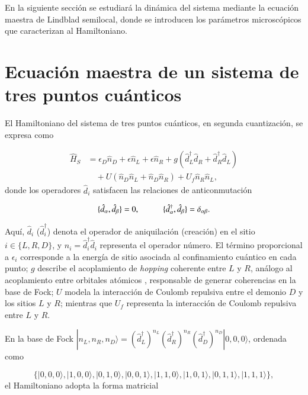 En la siguiente sección se estudiará la dinámica del sistema mediante la ecuación maestra de Lindblad semilocal, donde se introducen los parámetros microscópicos que caracterizan al Hamiltoniano.

\section{Ecuación maestra de un sistema de tres puntos cuánticos}

El Hamiltoniano del sistema de tres puntos cuánticos, en segunda cuantización, se expresa como 

\begin{align*}
    \hat{H}_{S} & = \epsilon_{D}\hat{n}_{D} + \epsilon \hat{n}_{L} + \epsilon \hat{n}_{R} + g(\hat{d}^{\dagger}_{L}\hat{d}_{R} + \hat{d}^{\dagger}_{R}\hat{d}_{L} ) \\
          & \quad + U(\hat{n}_{D}\hat{n}_{L} + \hat{n}_{D}\hat{n}_{R} )  + U_{f}\hat{n}_{R}\hat{n}_{L},
\end{align*}
donde los operadores $\hat{d}_{i}$ satisfacen las relaciones de anticonmutación

\begin{equation*}
    \{\hat{d}_{\alpha},\hat{d}_{\beta} \} = 0, \hspace{10mm} \{\hat{d}^{\dagger}_{\alpha}, \hat{d}_{\beta} \} = \delta_{\alpha \beta}.
\end{equation*}

Aquí, $\hat{d}_{i}$ ($\hat{d}^{\dagger}_{i}$) denota el operador de aniquilación (creación) en el sitio $i\in\{L,R,D\}$, y $\hat{n}_{i}=\hat{d}^\dagger_i\hat{d}_i$ representa el operador número. El término proporcional a $\epsilon_i$ corresponde a la energía de sitio asociada al confinamiento cuántico en cada punto; $g$ describe el acoplamiento de \textit{hopping} coherente entre $L$ y $R$, análogo al acoplamiento entre orbitales atómicos \cite{simon2013oxford}, responsable de generar coherencias en la base de Fock; $U$ modela la interacción de Coulomb repulsiva entre el demonio $D$ y los sitios $L$ y $R$; mientras que $U_f$ representa la interacción de Coulomb repulsiva entre $L$ y $R$.

En la base de Fock $|n_{L},n_{R},n_{D} \rangle = (\hat{d}^{\dagger}_{L})^{n_{L}}(\hat{d}^{\dagger}_{R})^{n_{R}}(\hat{d}^{\dagger}_{D})^{n_{D}}|0,0,0\rangle$, ordenada como

\begin{equation*}
     \{|0,0,0\rangle, |1,0,0\rangle, |0,1,0\rangle, |0,0,1\rangle, |1,1,0\rangle, |1,0,1\rangle, |0,1,1\rangle, |1,1,1\rangle\},
\end{equation*}
el Hamiltoniano adopta la forma matricial 

